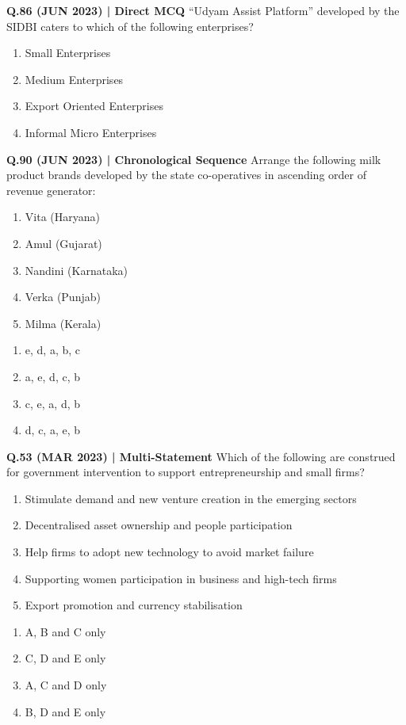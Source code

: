\documentclass{article}
\begin{document}
\textbf{Q.86 (JUN 2023) | Direct MCQ}
“Udyam Assist Platform” developed by the SIDBI caters to which of the following enterprises?
\begin{enumerate}[label=(\arabic*)]
    \item Small Enterprises
    \item Medium Enterprises
    \item Export Oriented Enterprises
    \item Informal Micro Enterprises
\end{enumerate}

\textbf{Q.90 (JUN 2023) | Chronological Sequence}
Arrange the following milk product brands developed by the state co-operatives in ascending order of revenue generator:
\begin{enumerate}[label=\alph*.]
    \item Vita (Haryana)
    \item Amul (Gujarat)
    \item Nandini (Karnataka)
    \item Verka (Punjab)
    \item Milma (Kerala)
\end{enumerate}
\begin{enumerate}[label=(\arabic*)]
    \item e, d, a, b, c
    \item a, e, d, c, b
    \item c, e, a, d, b
    \item d, c, a, e, b
\end{enumerate}

\textbf{Q.53 (MAR 2023) | Multi-Statement}
Which of the following are construed for government intervention to support entrepreneurship and small firms?
\begin{enumerate}[label=\Alph*.]
    \item Stimulate demand and new venture creation in the emerging sectors
    \item Decentralised asset ownership and people participation
    \item Help firms to adopt new technology to avoid market failure
    \item Supporting women participation in business and high-tech firms
    \item Export promotion and currency stabilisation
\end{enumerate}
\begin{enumerate}[label=(\arabic*)]
    \item A, B and C only
    \item C, D and E only
    \item A, C and D only
    \item B, D and E only
\end{enumerate}
\end{document}

